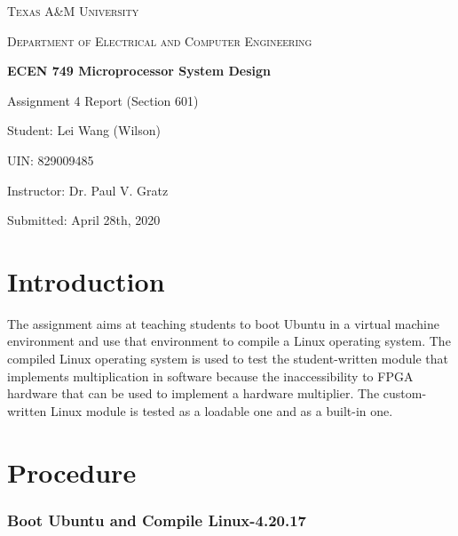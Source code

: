 \documentclass[11pt,letterpaper,titlepage]{article}
\begin{document}
\begin{titlepage}
  \centering
	{\scshape\large Texas A\&M University \par}
	\vspace{1cm}
	{\scshape\Large Department of Electrical and Computer Engineering \par}
	\vspace{4cm}
    \vspace{0.5cm}
	{\huge\bfseries ECEN 749 Microprocessor System Design\par}
	\vspace{4cm}
	{\Large Assignment 4 Report (Section 601)\par}
	\vspace{1cm}
	{\Large Student: Lei Wang (Wilson)\par}
	\vspace{1cm}
	{\Large UIN: 829009485\par}
	\vspace{1cm}
	{\Large Instructor: Dr. Paul V. Gratz\par}
	\vspace{4cm}
	\vfill

	{\large Submitted: April 28th, 2020 \par}

\end{titlepage}

\newpage

\tableofcontents{}

\newpage

\part{Introduction}

The assignment aims at teaching students to boot Ubuntu in a virtual machine environment and use that environment to compile a Linux operating system. The compiled Linux operating system is used to test the student-written module that implements multiplication in software because the inaccessibility to FPGA hardware that can be used to implement a hardware multiplier. The custom-written Linux module is tested as a loadable one and as a built-in one.

\part{Procedure}

\section{Boot Ubuntu and Compile Linux-4.20.17}
\end{document}

